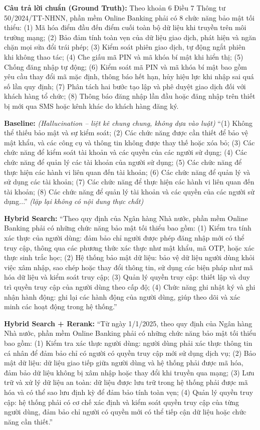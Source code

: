 \textbf{Câu trả lời chuẩn (Ground Truth):} Theo khoản 6 Điều 7 Thông tư 50/2024/TT-NHNN, phần mềm Online Banking phải có 8 chức năng bảo mật tối thiểu: (1) Mã hóa điểm đầu đến điểm cuối toàn bộ dữ liệu khi truyền trên môi trường mạng; (2) Bảo đảm tính toàn vẹn của dữ liệu giao dịch, phát hiện và ngăn chặn mọi sửa đổi trái phép; (3) Kiểm soát phiên giao dịch, tự động ngắt phiên khi không thao tác; (4) Che giấu mã PIN và mã khóa bí mật khi hiển thị; (5) Chống đăng nhập tự động; (6) Kiểm soát mã PIN và mã khóa bí mật bao gồm yêu cầu thay đổi mã mặc định, thông báo hết hạn, hủy hiệu lực khi nhập sai quá số lần quy định; (7) Phân tách hai bước tạo lập và phê duyệt giao dịch đối với khách hàng tổ chức; (8) Thông báo đăng nhập lần đầu hoặc đăng nhập trên thiết bị mới qua SMS hoặc kênh khác do khách hàng đăng ký.

\textbf{Baseline:} \textit{(Hallucination -- liệt kê chung chung, không dựa vào luật)} ``(1) Không thể thiếu bảo mật và sự kiểm soát; (2) Các chức năng được cần thiết để bảo vệ mật khẩu, và các công cụ và thông tin không được thay thế hoặc xóa bỏ; (3) Các chức năng để kiểm soát tài khoản và các quyền của các người sử dụng; (4) Các chức năng để quản lý các tài khoản của người sử dụng; (5) Các chức năng để thực hiện các hành vi liên quan đến tài khoản; (6) Các chức năng để quản lý và sử dụng các tài khoản; (7) Các chức năng để thực hiện các hành vi liên quan đến tài khoản; (8) Các chức năng để quản lý tài khoản và các quyền của các người sử dụng...'' \textit{(lặp lại không có nội dung thực chất)}

\textbf{Hybrid Search:} ``Theo quy định của Ngân hàng Nhà nước, phần mềm Online Banking phải có những chức năng bảo mật tối thiểu bao gồm: (1) Kiểm tra tính xác thực của người dùng: đảm bảo chỉ người được phép đăng nhập mới có thể truy cập, thông qua các phương thức xác thực như mật khẩu, mã OTP, hoặc xác thực sinh trắc học; (2) Hệ thống bảo mật dữ liệu: bảo vệ dữ liệu người dùng khỏi việc xâm nhập, sao chép hoặc thay đổi thông tin, sử dụng các biện pháp như mã hóa dữ liệu và kiểm soát truy cập; (3) Quản lý quyền truy cập: thiết lập và duy trì quyền truy cập của người dùng theo cấp độ; (4) Chức năng ghi nhật ký và ghi nhận hành động: ghi lại các hành động của người dùng, giúp theo dõi và xác minh các hoạt động trong hệ thống.''

\textbf{Hybrid Search + Rerank:} ``Từ ngày 1/1/2025, theo quy định của Ngân hàng Nhà nước, phần mềm Online Banking phải có những chức năng bảo mật tối thiểu bao gồm: (1) Kiểm tra xác thực người dùng: người dùng phải xác thực thông tin cá nhân để đảm bảo chỉ có người có quyền truy cập mới sử dụng dịch vụ; (2) Bảo mật dữ liệu: dữ liệu giao tiếp giữa người dùng và hệ thống phải được mã hóa, đảm bảo dữ liệu không bị xâm nhập hoặc thay đổi khi truyền qua mạng; (3) Lưu trữ và xử lý dữ liệu an toàn: dữ liệu được lưu trữ trong hệ thống phải được mã hóa và có thể sao lưu định kỳ để đảm bảo tính toàn vẹn; (4) Quản lý quyền truy cập: hệ thống phải có cơ chế xác định và kiểm soát quyền truy cập của từng người dùng, đảm bảo chỉ người có quyền mới có thể tiếp cận dữ liệu hoặc chức năng cần thiết.''


